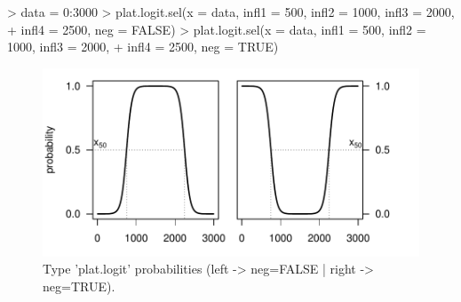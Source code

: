 \documentclass[letterpaper, 12pt]{article}
\begin{document}
\begin{Schunk}
\begin{Sinput}
> data = 0:3000
> plat.logit.sel(x = data, infl1 = 500, infl2 = 1000, infl3 = 2000, 
+     infl4 = 2500, neg = FALSE)
> plat.logit.sel(x = data, infl1 = 500, infl2 = 1000, infl3 = 2000, 
+     infl4 = 2500, neg = TRUE)
\end{Sinput}
\end{Schunk}
\begin{figure}[h]
\vspace{-20pt}
\begin{center}
\includegraphics{relation_sel-029}
\end{center}
\vspace{-30pt}
\caption{Type 'plat.logit' probabilities (left -> neg=FALSE |  right -> neg=TRUE).}
\vspace{-10pt}
\label{fig14}
\end{figure}
\end{document}
